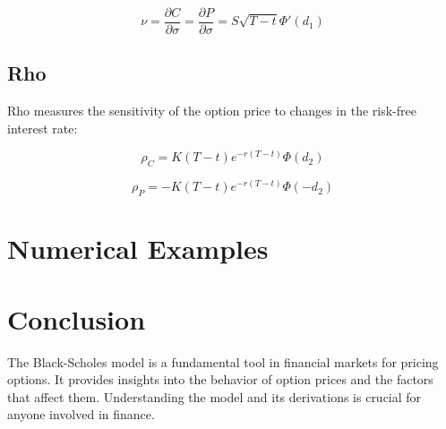 \documentclass[../Main.tex]{subfiles}
\begin{document}
\begin{equation}
    \nu = \frac{\partial C}{\partial \sigma} = \frac{\partial P}{\partial \sigma} = S \sqrt{T - t} \Phi'(d_1)
\end{equation}

\subsection{Rho}

Rho measures the sensitivity of the option price to changes in the risk-free interest rate:

\begin{equation}
    \rho_C = K (T - t) e^{-r(T - t)} \Phi(d_2)
\end{equation}

\begin{equation}
    \rho_P = -K (T - t) e^{-r(T - t)} \Phi(-d_2)
\end{equation}


\section{Numerical Examples}



\section{Conclusion}

The Black-Scholes model is a fundamental tool in financial markets for pricing options. It provides insights into the behavior of option prices and the factors that affect them. Understanding the model and its derivations is crucial for anyone involved in finance.
\end{document}
